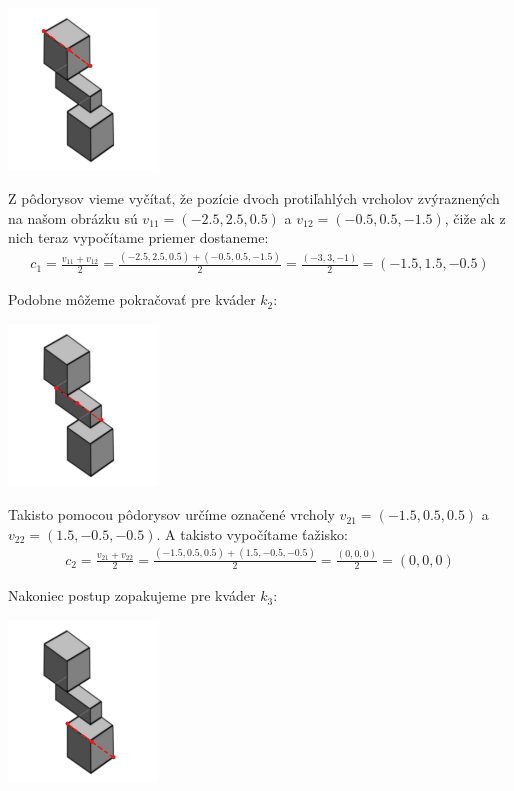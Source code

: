 \documentclass[a4paper]{article}
\begin{document}
	\centerline{\includegraphics[width=0.3\textwidth]{taz_k_1}} 
	
	Z pôdorysov vieme vyčítať, že pozície dvoch protiľahlých vrcholov zvýraznených na našom obrázku sú $v_{11} = (-2.5, 2.5, 0.5)$ a $v_{12} = (-0.5, 0.5, -1.5)$, čiže ak z nich teraz vypočítame priemer dostaneme:
	\begin{align*}
		c_1 = \frac{v_{11} + v_{12}}{2} = \frac{(-2.5, 2.5, 0.5) + (-0.5, 0.5, -1.5)}{2} = \frac{(-3, 3, -1)}{2} = (-1.5, 1.5, -0.5)
	\end{align*}

	Podobne môžeme pokračovať pre kváder $k_2$:
	
	\centerline{\includegraphics[width=0.3\textwidth]{taz_k_2}}
	
	Takisto pomocou pôdorysov určíme označené vrcholy $v_{21} = (-1.5, 0.5, 0.5)$ a $v_{22} = (1.5, -0.5, -0.5)$. A takisto vypočítame ťažisko:
	\begin{align*}
		c_2 = \frac{v_{21} + v_{22}}{2} = \frac{(-1.5, 0.5, 0.5) + (1.5, -0.5, -0.5)}{2} = \frac{(0, 0, 0)}{2} = (0, 0, 0)
	\end{align*}
	
	Nakoniec postup zopakujeme pre kváder $k_3$:
	
	\centerline{\includegraphics[width=0.3\textwidth]{taz_k_3}}
	
\end{document}
